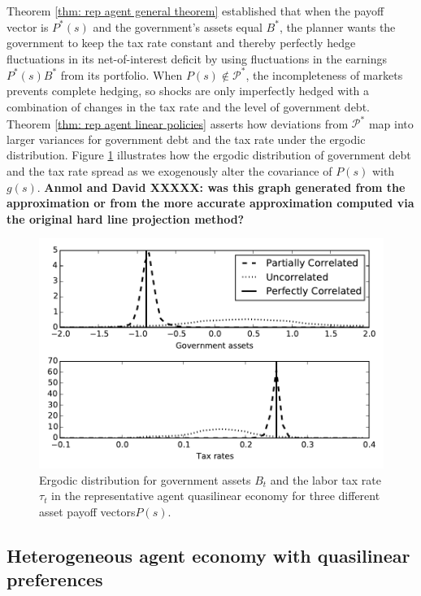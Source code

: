 \documentclass[thmsb,11pt]{article}
\begin{document}
 Theorem \ref{thm: rep agent general theorem} established  that when the payoff vector is $P^*(s)$ and the government's assets equal $B^*$, the
 planner  wants the government  to keep the tax rate constant and thereby perfectly  hedge fluctuations in its net-of-interest deficit
by using fluctuations in the earnings  $P^*(s)B^*$ from its  portfolio.  When $P(s) \not \in \mathcal{P}^*$, the incompleteness of markets prevents complete hedging, so  shocks are only imperfectly
hedged with a combination of changes in the tax rate
and the level of government debt. Theorem \ref{thm: rep agent linear policies}  asserts   how  deviations from $\mathcal{P}^*$ map into larger variances for government debt and the tax rate
under the ergodic distribution. Figure \ref{fig: ergodic distribution ql} illustrates  how the ergodic distribution of government debt and the tax rate spread as we
exogenously alter  the covariance of $P(s)$ with $g(s)$. \textbf{Anmol and David XXXXX: was this graph generated from the approximation
or from the more accurate approximation computed via the original hard line projection method?}
 \begin{figure}[htp]
 \centering
	 \includegraphics[width=7in]{plots/ErgodicQL.pdf}
 \caption{Ergodic distribution for government assets $B_t$ and the labor tax rate $\tau_t$ in the representative agent quasilinear economy for three different
 asset payoff vectors$P(s)$.}
 \label{fig: ergodic distribution ql}
 \end{figure}



\subsection{Heterogeneous agent economy with quasilinear preferences\label{sec:hetquasilinear}}
\end{document}
